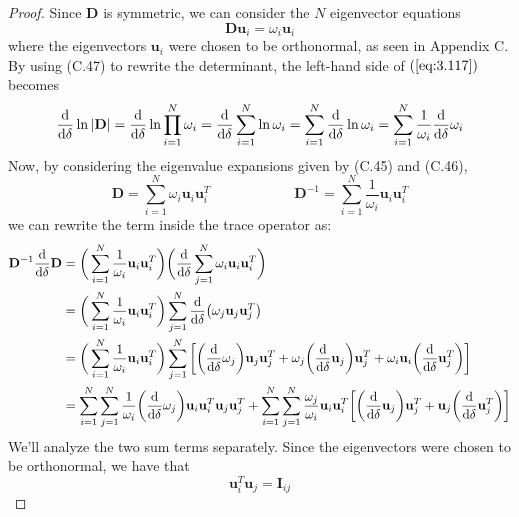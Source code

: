 \begin{proof}
    Since $\mathbf{D}$ is symmetric, we can consider the $N$ eigenvector equations
    \[
        \mathbf{D}\mathbf{u}_i = \omega_i\mathbf{u}_i
    \] 
    where the eigenvectors $\mathbf{u}_i$ were chosen to be orthonormal,
    as seen in Appendix C. By using (C.47) to rewrite the determinant,
    the left-hand side of $(\ref{eq:3.117})$ becomes
     \[
         \dv{\delta}\ln|\mathbf{D}|
         = \dv{\delta}\ln \prod_{i=1}^N \omega_i
         = \dv{\delta} \sum_{i=1}^{N} \ln \omega_i
         = \sum_{i=1}^{N} \dv{\delta} \ln \omega_i
         = \sum_{i=1}^{N} \frac{1}{\omega_i} \dv{\delta} \omega_i
    \] 
    Now, by considering the eigenvalue expansions given by (C.45) and (C.46),
    \[
        \mathbf{D} = \sum_{i=1}^{N} \omega_i \mathbf{u}_i\mathbf{u}_i^T
        \hspace{6em}
        \mathbf{D}^{-1} = \sum_{i=1}^{N} \frac{1}{\omega_i} \mathbf{u}_i\mathbf{u}_i^T
    \] 
    we can rewrite the term inside the trace operator as:
    \begin{align*}
        \mathbf{D}^{-1}\dv{\delta}\mathbf{D} 
        &= \bigg(\sum_{i=1}^{N} \frac{1}{\omega_i} \mathbf{u}_i\mathbf{u}_i^T\bigg)
        \bigg(\dv{\delta} \sum_{j=1}^{N} \omega_i\mathbf{u}_i\mathbf{u}_i^T\bigg) \\
        &= \bigg(\sum_{i=1}^{N} \frac{1}{\omega_i} \mathbf{u}_i\mathbf{u}_i^T\bigg)
        \sum_{j=1}^{N} \dv{\delta}(\omega_j\mathbf{u}_j\mathbf{u}_j^T) \\
        &= \bigg(\sum_{i=1}^{N} \frac{1}{\omega_i} \mathbf{u}_i\mathbf{u}_i^T\bigg)
        \sum_{j=1}^{N} \bigg[\bigg(\dv{\delta} \omega_j\bigg) \mathbf{u}_j\mathbf{u}_j^T 
            + \omega_j \bigg(\dv{\delta}\mathbf{u}_j\bigg) \mathbf{u}_j^T
        + \omega_i \mathbf{u}_i \bigg(\dv{\delta} \mathbf{u}_j^T\bigg)\bigg] \\
        &= \sum_{i=1}^{N} \sum_{j=1}^{N}  
            \frac{1}{\omega_i} \bigg(\dv{\delta}\omega_j\bigg) \mathbf{u}_i\mathbf{u}_i^T 
            \mathbf{u}_j\mathbf{u}_j^T 
        + \sum_{i=1}^{N} \sum_{j=1}^{N} \frac{\omega_j}{\omega_i} \mathbf{u}_i\mathbf{u}_i^T
        \bigg[\bigg(\dv{\delta} \mathbf{u}_j\bigg)\mathbf{u}_j^T 
        + \mathbf{u}_j\bigg(\dv{\delta}\mathbf{u}_j^T\bigg)\bigg]
    \end{align*}
    We'll analyze the two sum terms separately. Since the
    eigenvectors were chosen to be orthonormal, we have that
    \begin{equation}\label{eq:C.33}\tag{C.33}
        \mathbf{u}_i^T\mathbf{u}_j = \mathbf{I}_{ij}

\end{equation}
\end{proof}
